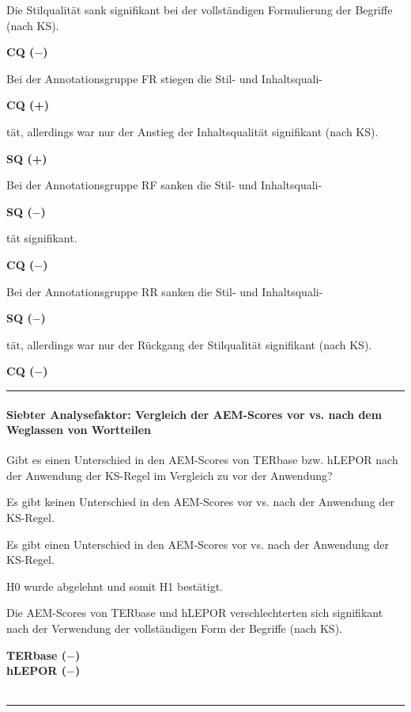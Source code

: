 \noindent
\parbox[t]{.8\textwidth}{
Die Stilqualität sank signifikant bei der vollständigen Formulierung der Begriffe (nach KS).
}
\parbox[t]{.04\textwidth}{}
\parbox[t]{.15\textwidth}{
\textbf{CQ ($-$)}
}

\medskip
\noindent
\parbox[t]{.8\textwidth}{
Bei der Annotationsgruppe FR stiegen die Stil- und Inhaltsquali-
}
\parbox[t]{.04\textwidth}{}
\colorbox{smGreen}{\parbox[t]{.15\textwidth}{\textbf{CQ (+)}}}

\noindent
\parbox[t]{.8\textwidth}{
tät, allerdings war nur der Anstieg der Inhaltsqualität signifikant (nach KS).
}
\parbox[t]{.04\textwidth}{}
\parbox[t]{.15\textwidth}{
\textbf{SQ (+)}
}

\medskip
\noindent
\parbox[t]{.8\textwidth}{
Bei der Annotationsgruppe RF sanken die Stil- und Inhaltsquali-
}
\parbox[t]{.04\textwidth}{}
\colorbox{smGreen}{\parbox[t]{.15\textwidth}{{ \textbf{SQ ($-$)}}}}

\noindent
\parbox[t]{.8\textwidth}{
tät signifikant.
}
\parbox[t]{.04\textwidth}{}
\colorbox{smGreen}{
\parbox[t]{.15\textwidth}{
\textbf{CQ ($-$)}
}
}

\medskip
\noindent
\parbox[t]{.8\textwidth}{
Bei der Annotationsgruppe RR sanken die Stil- und Inhaltsquali-
}
\parbox[t]{.04\textwidth}{}
\colorbox{smGreen}{\parbox[t]{.15\textwidth}{\textbf{SQ ($-$)}}}

\noindent
\parbox[t]{.8\textwidth}{
tät, allerdings war nur der Rückgang der Stilqualität signifikant (nach KS).
}
\parbox[t]{.04\textwidth}{}
\parbox[t]{.15\textwidth}{
\textbf{CQ ($-$)}
}
\smallskip
\hrule
\paragraph*{Siebter Analysefaktor: Vergleich der AEM-Scores vor vs. nach dem Weglassen von Wortteilen}
\begin{description}[font=\normalfont\bfseries]
\item [Fragestellung:] Gibt es einen Unterschied in den AEM-Scores von TERbase bzw. hLEPOR nach der Anwendung der KS-Regel im Vergleich zu vor der Anwendung?
\item [H0 --] Es gibt keinen Unterschied in den AEM-Scores vor vs. nach der Anwendung der KS-Regel.
\item [H1 --] Es gibt einen Unterschied in den AEM-Scores vor vs. nach der Anwendung der KS-Regel.
\item [Resultat]
\end{description}
\noindent
\parbox[t]{.75\textwidth}{
H0 wurde abgelehnt und somit H1 bestätigt.

Die AEM-Scores von TERbase und hLEPOR verschlechterten sich signifikant nach der Verwendung der vollständigen Form der Begriffe (nach KS).
}
\parbox[t]{.04\textwidth}{}
\colorbox{smGreen}{\parbox[t]{.2\textwidth}{
\textbf{TERbase ($-$)\\hLEPOR ($-$)}\\
\\
}}
\smallskip
\hrule
